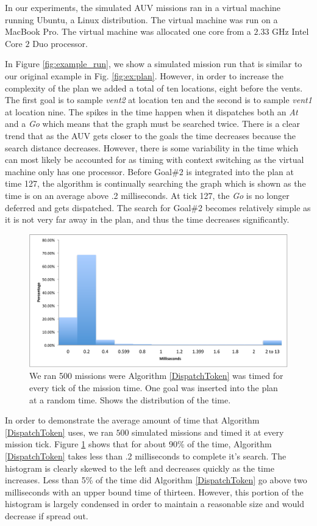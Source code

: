 In our experiments, the simulated AUV missions ran in a virtual
machine running Ubuntu, a Linux distribution. The virtual machine was
run on a MacBook Pro. The virtual machine was allocated one core from
a $2.33$ GHz Intel Core $2$ Duo processor.

In Figure \ref{fig:example_run}, we show a simulated mission run that
is similar to our original example in Fig. \ref{fig:ex:plan}.
However, in order to increase the complexity of the plan we added a
total of ten locations, eight before the vents. The first goal is to
sample {\em vent2} at location ten and the second is to sample {\em
  vent1} at location nine. The spikes in the time happen when it
dispatches both an {\em At} and a {\em Go} which means that the graph
must be searched twice. There is a clear trend that as the AUV gets
closer to the goals the time decreases because the search distance
decreases.  However, there is some variability in the time which can
most likely be accounted for as timing with context switching as the
virtual machine only has one processor. Before Goal\#2 is integrated
into the plan at time 127, the algorithm is continually searching the
graph which is shown as the time is on an average above .2
milliseconds. At tick 127, the {\em Go} is no longer deferred and gets
dispatched. The search for Goal\#2 becomes relatively simple as it is
not very far away in the plan, and thus the time decreases
significantly.

\begin{figure}[!htbp]
  \centering
  \includegraphics[width=\columnwidth]{figs/HistogramAlg1}
  \caption{\small We ran 500 missions were Algorithm
    \ref{DispatchToken} was timed for every tick of the mission time.
    One goal was inserted into the plan at a random time. Shows the
    distribution of the time.}
  \label{fig:histogram}
\end{figure}

In order to demonstrate the average amount of time that Algorithm
\ref{DispatchToken} uses, we ran $500$ simulated missions and timed it
at every mission tick. Figure \ref{fig:histogram} shows that for about
90\% of the time, Algorithm \ref{DispatchToken} takes less than .2
milliseconds to complete it's search. The histogram is clearly skewed
to the left and decreases quickly as the time increases. Less than 5\%
of the time did Algorithm \ref{DispatchToken} go above two
milliseconds with an upper bound time of thirteen. However, this
portion of the histogram is largely condensed in order to maintain a
reasonable size and would decrease if spread out.

